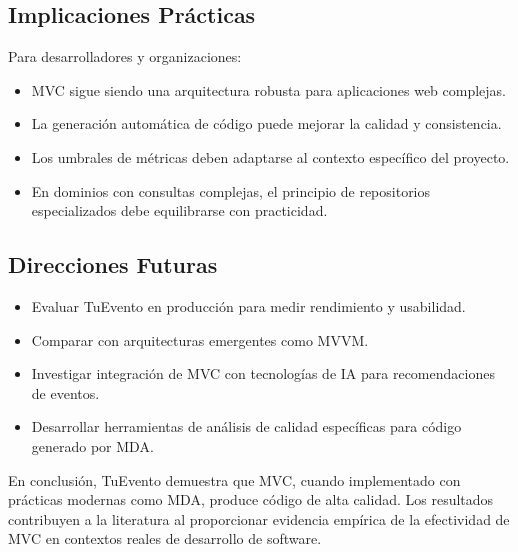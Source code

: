 \subsection{Implicaciones Prácticas}
Para desarrolladores y organizaciones:
\begin{itemize}
\item MVC sigue siendo una arquitectura robusta para aplicaciones web complejas.
\item La generación automática de código puede mejorar la calidad y consistencia.
\item Los umbrales de métricas deben adaptarse al contexto específico del proyecto.
\item En dominios con consultas complejas, el principio de repositorios especializados debe equilibrarse con practicidad.
\end{itemize}

\subsection{Direcciones Futuras}
\begin{itemize}
\item Evaluar TuEvento en producción para medir rendimiento y usabilidad.
\item Comparar con arquitecturas emergentes como MVVM.
\item Investigar integración de MVC con tecnologías de IA para recomendaciones de eventos.
\item Desarrollar herramientas de análisis de calidad específicas para código generado por MDA.
\end{itemize}

En conclusión, TuEvento demuestra que MVC, cuando implementado con prácticas modernas como MDA, produce código de alta calidad. Los resultados contribuyen a la literatura al proporcionar evidencia empírica de la efectividad de MVC en contextos reales de desarrollo de software.